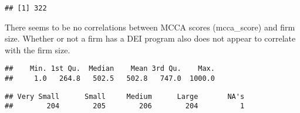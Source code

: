\documentclass[
]{article}
\newenvironment{Shaded}{\begin{snugshade}}{\end{snugshade}}
\newcommand{\AttributeTok}[1]{\textcolor[rgb]{0.13,0.29,0.53}{#1}}
\newcommand{\CommentTok}[1]{\textcolor[rgb]{0.56,0.35,0.01}{\textit{#1}}}
\newcommand{\DecValTok}[1]{\textcolor[rgb]{0.00,0.00,0.81}{#1}}
\newcommand{\FunctionTok}[1]{\textcolor[rgb]{0.13,0.29,0.53}{\textbf{#1}}}
\newcommand{\NormalTok}[1]{#1}
\newcommand{\OtherTok}[1]{\textcolor[rgb]{0.56,0.35,0.01}{#1}}
\newcommand{\SpecialCharTok}[1]{\textcolor[rgb]{0.81,0.36,0.00}{\textbf{#1}}}
\newcommand{\StringTok}[1]{\textcolor[rgb]{0.31,0.60,0.02}{#1}}
\begin{document}
\begin{verbatim}
## [1] 322
\end{verbatim}

There seems to be no correlations between MCCA scores (mcca\_score) and
firm size. Whether or not a firm has a DEI program also does not appear
to correlate with the firm size.

\begin{Shaded}
\end{Shaded}

\begin{verbatim}
##    Min. 1st Qu.  Median    Mean 3rd Qu.    Max. 
##     1.0   264.8   502.5   502.8   747.0  1000.0
\end{verbatim}

\begin{Shaded}
\end{Shaded}

\begin{verbatim}
## Very Small      Small     Medium      Large       NA's 
##        204        205        206        204          1
\end{verbatim}
\end{document}
